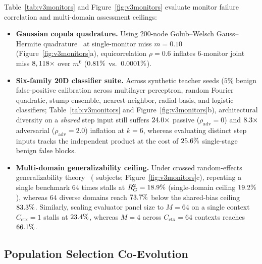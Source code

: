 Table~\ref{tab:v3monitors} and Figure~\ref{fig:v3monitors} evaluate monitor failure correlation and multi-domain assessment ceilings:
\begin{itemize}
  \item \textbf{Gaussian copula quadrature.} Using 200-node Golub--Welsch Gauss--Hermite quadrature~\cite{golub} at single-monitor miss \(m = 0.10\) (Figure~\ref{fig:v3monitors}a), equicorrelation \(\rho = 0.6\) inflates 6-monitor joint miss \(8,118\times\) over \(m^6\) (\(0.81\%\) vs.\ \(0.0001\%\)).
  \item \textbf{Six-family 20D classifier suite.} Across \VThreeMonTasks{} synthetic teacher seeds (\(5\%\) benign false-positive calibration across multilayer perceptron, random Fourier quadratic, stump ensemble, nearest-neighbor, radial-basis, and logistic classifiers; Table~\ref{tab:v3monitors} and Figure~\ref{fig:v3monitors}b), architectural diversity on a \emph{shared} step input still suffers \(24.0\times\) passive (\(\rho_{\mathrm{adv}} = 0\)) and \(8.3\times\) adversarial (\(\rho_{\mathrm{adv}} = 2.0\)) inflation at \(k = 6\), whereas evaluating distinct step inputs tracks the independent product at the cost of \(25.6\%\) single-stage benign false blocks.
  \item \textbf{Multi-domain generalizability ceiling.} Under crossed random-effects generalizability theory~\cite{cronbach} (\VThreeVarSubjects{} subjects; Figure~\ref{fig:v3monitors}c), repeating a single benchmark \(64\) times stalls at \(R_G^2 = 18.9\%\) (single-domain ceiling \(19.2\%\)), whereas \(64\) diverse domains reach \(73.7\%\) below the shared-bias ceiling \(83.3\%\). Similarly, scaling evaluator panel size to \(M = 64\) on a single context \(C_{\mathrm{ctx}} = 1\) stalls at \(23.4\%\), whereas \(M = 4\) across \(C_{\mathrm{ctx}} = 64\) contexts reaches \(66.1\%\).
\end{itemize}




\subsection{Population Selection Co-Evolution}

